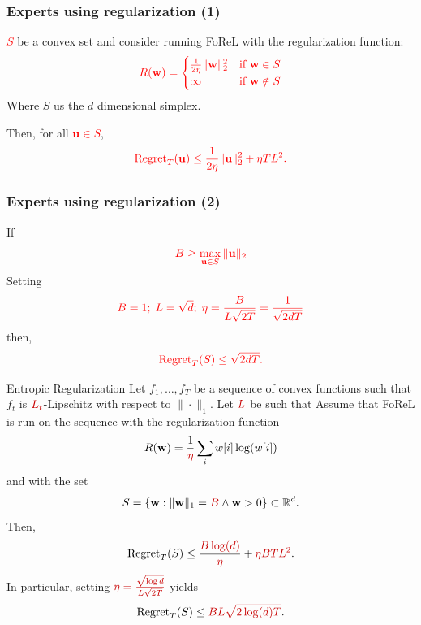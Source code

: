 \documentclass[handout]{beamer}
\newcommand{\redmath}[1]{\textcolor{mathred}{#1}}
\begin{document}
\begin{frame}
    \frametitle{Experts using  regularization (1)}
    \textcolor{red}{$S$} 
    be a convex set and consider running FoReL with the regularization function:
    \[
    \textcolor{red}{R(\mathbf{w}) = 
    \begin{cases} 
    \frac{1}{2\eta} \|\mathbf{w}\|_2^2 & \text{if } \mathbf{w} \in S \\ 
    \infty & \text{if } \mathbf{w} \notin S 
    \end{cases}}
    \]
    Where $S$ us the $d$ dimensional simplex.

    Then, for all 
    \textcolor{red}{$\mathbf{u} \in S$},
    \[
    \textcolor{red}{\operatorname{Regret}_T(\mathbf{u}) \leq \frac{1}{2\eta} \|\mathbf{u}\|_2^2 + \eta T L^2.}
    \]
\end{frame}

\begin{frame}
    \frametitle{Experts using  regularization (2)}
    If 
    \[
    \textcolor{red}{B \geq \max_{\mathbf{u} \in S} \|\mathbf{u}\|_2}
    \]
    Setting
    \[
    \textcolor{red}{B=1;\; L=\sqrt{d};\;\eta = \frac{B}{L \sqrt{2T}}=\frac{1}{\sqrt{2dT}}}
    \]
    then,
    \[
    \textcolor{red}{\operatorname{Regret}_T(S) \leq \sqrt{2dT}.}
    \]
\end{frame}


\begin{frame}{Entropic Regularization}
    Let \( f_1, \dots, f_T \) be a sequence of convex functions such that 
    \( f_t \) is \( \redmath{L_t} \)-Lipschitz with respect to \( \|\cdot\|_1 \). 
    Let \( \redmath{L} \) be such that 
    \R{$
    \frac{1}{T} \sum_{t=1}^{T} \redmath{L_t^2} \leq \redmath{L^2}.
    $}
    Assume that FoReL is run on the sequence with the regularization function 
    \[
    R(\mathbf{w}) = \frac{1}{\redmath{\eta}} \sum_{i} w[i] \log(w[i])
    \]
    and with the set 
    \[
    S = \{\mathbf{w} : \|\mathbf{w}\|_1 = \redmath{B} \wedge \mathbf{w} > 0 \} \subset \mathbb{R}^d.
    \]
    Then, 
    \[
    \text{Regret}_T(S) \leq \frac{\redmath{B \log(d)}}{\redmath{\eta}} + \redmath{\eta BTL^2}.
    \]
    In particular, setting \( \redmath{\eta = \frac{\sqrt{\log d}}{L\sqrt{2T}}} \) yields
    \[
    \text{Regret}_T(S) \leq \redmath{BL\sqrt{2\log(d)T}}.
    \]
  \end{frame}
\end{document}
